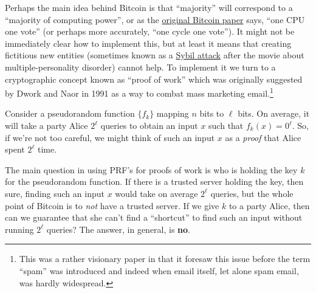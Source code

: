 Perhaps the main idea behind Bitcoin is that ``majority'' will
correspond to a ``majority of computing power'', or as the
\href{https://Bitcoin.org/Bitcoin.pdf}{original Bitcoin paper} says,
``one CPU one vote'' (or perhaps more accurately, ``one cycle one
vote''). It might not be immediately clear how to implement this, but at
least it means that creating fictitious new entities (sometimes known as
a \href{https://goo.gl/jMZ7Qg}{Sybil attack} after the movie about
multiple-personality disorder) cannot help. To implement it we turn to a
cryptographic concept known as ``proof of work'' which was originally
suggested by Dwork and Naor in 1991 as a way to combat mass marketing
email.\footnote{This was a rather visionary paper in that it foresaw
  this issue before the term ``spam'' was introduced and indeed when
  email itself, let alone spam email, was hardly widespread.}

Consider a pseudorandom function \(\{ f_k \}\) mapping \(n\) bits to
\(\ell\) bits. On average, it will take a party Alice \(2^\ell\) queries
to obtain an input \(x\) such that \(f_k(x)=0^\ell\). So, if we're not
too careful, we might think of such an input \(x\) as a \emph{proof}
that Alice spent \(2^\ell\) time.


The main question in using PRF's for proofs of work is who is holding
the key \(k\) for the pseudorandom function. If there is a trusted
server holding the key, then sure, finding such an input \(x\) would
take on average \(2^\ell\) queries, but the whole point of Bitcoin is to
\emph{not} have a trusted server. If we give \(k\) to a party Alice,
then can we guarantee that she can't find a ``shortcut'' to find such an
input without running \(2^\ell\) queries? The answer, in general, is
\textbf{no}.


